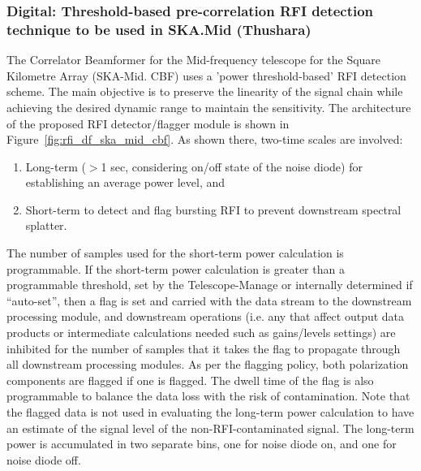 \subsubsection{Digital: Threshold-based pre-correlation RFI detection technique to be used in SKA.Mid (Thushara)}
\label{subsection:hardware:catalog:ska-mid}

The Correlator Beamformer for the Mid-frequency telescope for the Square Kilometre Array (SKA-Mid. CBF) uses a 'power threshold-based' RFI detection scheme. The main objective is to preserve the linearity of the signal chain while achieving the desired dynamic range to maintain the sensitivity. The architecture of the proposed RFI detector/flagger module is shown in Figure~\ref{fig:rfi_df_ska_mid_cbf}. As shown there, two-time scales are involved:
\begin{enumerate}
    \item Long-term ($>$1 sec, considering on/off state of the noise diode) for establishing an average power level, and
    \item Short-term to detect and flag bursting RFI to prevent downstream spectral splatter.
\end{enumerate}

The number of samples used for the short-term power calculation is programmable. If the short-term power calculation is greater than a programmable threshold, set by the Telescope-Manage or internally determined if “auto-set”, then a flag is set and carried with the data stream to the downstream processing module, and downstream operations (i.e. any that affect output data products or intermediate calculations needed such as gains/levels settings) are inhibited for the number of samples that it takes the flag to propagate through all downstream processing modules. As per the flagging policy, both polarization components are flagged if one is flagged. The dwell time of the flag is also programmable to balance the data loss with the risk of contamination. Note that the flagged data is not used in evaluating the long-term power calculation to have an estimate of the signal level of the non-RFI-contaminated signal. The long-term power is accumulated in two separate bins, one for noise diode on, and one for noise diode off.

